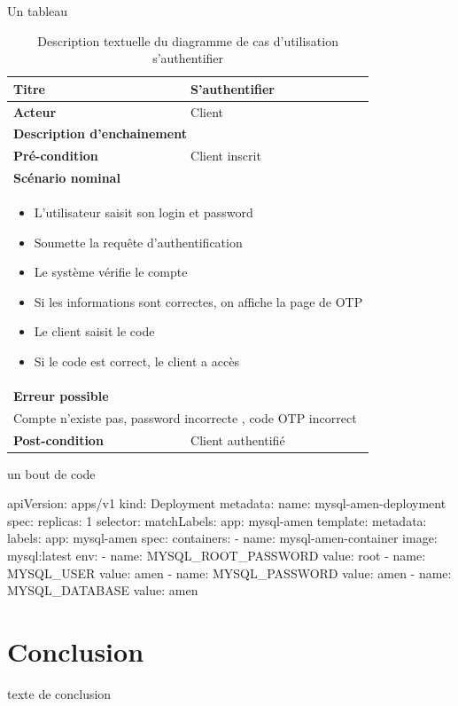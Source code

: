 \clearpage
Un tableau
\begin{table}[h]
    \centering
    \small  %
    \begin{tabularx}{\textwidth}{|X|X|}
    \hline
    \textbf{Titre} & S'authentifier \\
    \hline
        \textbf{Acteur} & Client \\
    \hline
        \multicolumn{2}{|X|}{\textbf{Description d'enchainement}}\\
    \hline
        \textbf{Pré-condition} & Client inscrit \\
    \hline
    \multicolumn{2}{|X|}{\textbf{Scénario nominal}}\\
    \hline
    \multicolumn{2}{|X|}{  %
        \begin{itemize}[left=0pt]
            \item L'utilisateur saisit son login et password
            \item Soumette la requête d'authentification
            \item Le système vérifie le compte
            \item Si les informations sont correctes, on affiche la page de OTP
            \item Le client saisit le code
            \item Si le code est correct, le client a accès
        \end{itemize}
    } \\
    \hline
    \multicolumn{2}{|X|}{\textbf{Erreur possible}}\\
    \hline
    \multicolumn{2}{|X|}{Compte n'existe pas, password incorrecte , code OTP incorrect}\\
    \hline
    \textbf{Post-condition} & Client authentifié \\
    \hline
    \end{tabularx}
        \caption{Description textuelle du diagramme de cas d'utilisation s'authentifier}
    \label{tab:usecase}
\end{table}

\clearpage
un bout de code
\begin{mycode}[caption=Deployment MySQL]
    apiVersion: apps/v1
    kind: Deployment
    metadata:
      name: mysql-amen-deployment
    spec:
      replicas: 1
      selector:
        matchLabels:
          app: mysql-amen
      template:
        metadata:
          labels:
            app: mysql-amen
        spec:
          containers:
            - name: mysql-amen-container
              image: mysql:latest
              env:
                - name: MYSQL_ROOT_PASSWORD
                  value: root
                - name: MYSQL_USER
                  value: amen
                - name: MYSQL_PASSWORD
                  value: amen
                - name: MYSQL_DATABASE
                  value: amen
    
    \end{mycode}


\section*{Conclusion}
texte de conclusion
